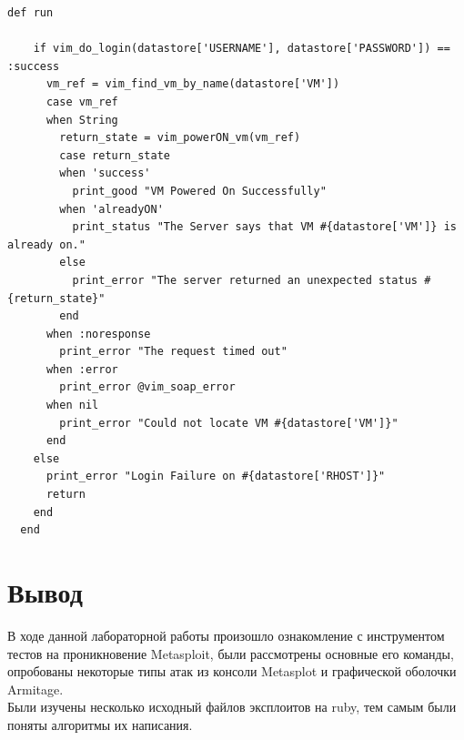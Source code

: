 \documentclass[10pt,a4paper]{report}
\begin{document}
\begin{verbatim}
def run

    if vim_do_login(datastore['USERNAME'], datastore['PASSWORD']) == :success
      vm_ref = vim_find_vm_by_name(datastore['VM'])
      case vm_ref
      when String
        return_state = vim_powerON_vm(vm_ref)
        case return_state
        when 'success'
          print_good "VM Powered On Successfully"
        when 'alreadyON'
          print_status "The Server says that VM #{datastore['VM']} is already on."
        else
          print_error "The server returned an unexpected status #{return_state}"
        end
      when :noresponse
        print_error "The request timed out"
      when :error
        print_error @vim_soap_error
      when nil
        print_error "Could not locate VM #{datastore['VM']}"
      end
    else
      print_error "Login Failure on #{datastore['RHOST']}"
      return
    end
  end
\end{verbatim}
\section{Вывод}
В ходе данной лабораторной работы произошло ознакомление с инструментом тестов на проникновение Metasploit, были рассмотрены основные его команды, опробованы некоторые типы атак из консоли Metasplot и графической оболочки Armitage. \\
Были изучены несколько исходный файлов эксплоитов на ruby, тем самым были поняты алгоритмы их написания. 
\end{document}
